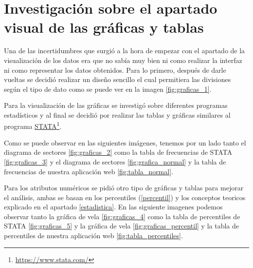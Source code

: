 \section{Investigación sobre el apartado visual de las gráficas y tablas}

Una de las incertidumbres que surgió a la hora de empezar con el apartado de la visualización de los datos era que no sabía muy bien ni como realizar la interfaz ni como representar los datos obtenidos. Para lo primero, después de darle vueltas se decidió realizar un diseño sencillo el cual permitiera las divisiones según el tipo de dato como se puede ver en la imagen \ref{fig:graficas_1}.  


Para la visualización de las gráficas se investigó sobre diferentes programas estadísticos y al final se decidió por realizar las tablas y gráficas similares al programa \href{https://www.stata.com/}{STATA}\footnote{\href{https://www.stata.com/}{https://www.stata.com/}}.

Como se puede observar en las siguientes imágenes, tenemos por un lado tanto el diagrama de sectores \ref{fig:graficas_2} como la tabla de frecuencias de STATA \ref{fig:graficas_3} y el diagrama de sectores \ref{fig:grafica_normal} y la tabla de frecuencias de nuestra aplicación web \ref{fig:tabla_normal}.


Para los atributos numéricos se pidió otro tipo de gráficas y tablas para mejorar el análisis, ambas se basan en los percentiles (\ref{percentil}) y los conceptos teoricos explicado en el apartado \ref{estadistica}. En las siguiente imagenes podemos observar tanto la gráfica de vela \ref{fig:graficas_4} como la tabla de percentiles de STATA \ref{fig:graficas_5} y la gráfica de vela \ref{fig:graficas_percentil} y la tabla de percentiles de nuestra aplicación web \ref{fig:tabla_percentiles}.


